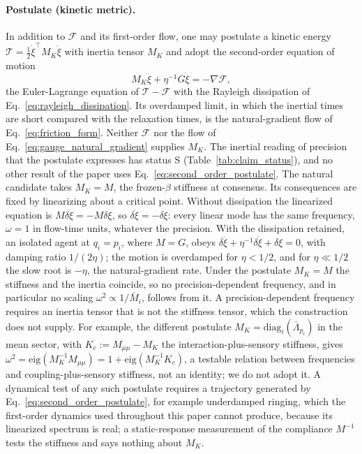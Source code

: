 \paragraph{Postulate (kinetic metric).} In addition to $\mathcal{F}$ and its first-order flow, one may postulate a kinetic energy $\mathcal{T} = \tfrac12 \dot{\xi}^\top M_K \dot{\xi}$ with inertia tensor $M_K$ and adopt the second-order equation of motion
\begin{equation}
M_K\ddot{\xi} + \eta^{-1}G\dot{\xi} = -\nabla\mathcal{F},
\label{eq:second_order_postulate}
\end{equation}
the Euler-Lagrange equation of $\mathcal{T} - \mathcal{F}$ with the Rayleigh dissipation of Eq.~\eqref{eq:rayleigh_dissipation}. Its overdamped limit, in which the inertial times are short compared with the relaxation times, is the natural-gradient flow of Eq.~\eqref{eq:friction_form}. Neither $\mathcal{F}$ nor the flow of Eq.~\eqref{eq:gauge_natural_gradient} supplies $M_K$. The inertial reading of precision that the postulate expresses has status S (Table~\ref{tab:claim_status}), and no other result of the paper uses Eq.~\eqref{eq:second_order_postulate}. The natural candidate takes $M_K = M$, the frozen-$\beta$ stiffness at consensus. Its consequences are fixed by linearizing about a critical point. Without dissipation the linearized equation is $M\delta\ddot{\xi} = -M\delta\xi$, so $\delta\ddot{\xi} = -\delta\xi$: every linear mode has the same frequency, $\omega = 1$ in flow-time units, whatever the precision. With the dissipation retained, an isolated agent at $q_i = p_i$, where $M = G$, obeys $\delta\ddot{\xi} + \eta^{-1}\delta\dot{\xi} + \delta\xi = 0$, with damping ratio $1/(2\eta)$; the motion is overdamped for $\eta < 1/2$, and for $\eta \ll 1/2$ the slow root is $-\eta$, the natural-gradient rate. Under the postulate $M_K = M$ the stiffness and the inertia coincide, so no precision-dependent frequency, and in particular no scaling $\omega^2 \propto 1/\bar{M}_i$, follows from it. A precision-dependent frequency requires an inertia tensor that is not the stiffness tensor, which the construction does not supply. For example, the different postulate $M_K = \mathrm{diag}_i(\bar{\Lambda}_{p_i})$ in the mean sector, with $K_c := M_{\mu\mu} - M_K$ the interaction-plus-sensory stiffness, gives $\omega^2 = \mathrm{eig}(M_K^{-1}M_{\mu\mu}) = 1 + \mathrm{eig}(M_K^{-1}K_c)$, a testable relation between frequencies and coupling-plus-sensory stiffness, not an identity; we do not adopt it. A dynamical test of any such postulate requires a trajectory generated by Eq.~\eqref{eq:second_order_postulate}, for example underdamped ringing, which the first-order dynamics used throughout this paper cannot produce, because its linearized spectrum is real; a static-response measurement of the compliance $M^{-1}$ tests the stiffness and says nothing about $M_K$.

